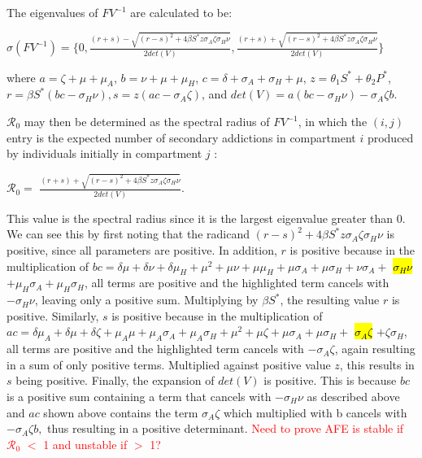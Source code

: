 \documentclass[12pt]{article}
\begin{document}
The eigenvalues of $FV^{-1}$ are calculated to be: 
\begin{center}
$\sigma (FV^{-1}) = \{0, \frac{(r+s)-\sqrt{(r-s)^2+4\beta S^* z  \sigma_A \zeta \sigma_H \nu}}{2det(V)} 
, \frac{(r+s)+\sqrt{(r-s)^2+4\beta S^* z  \sigma_A \zeta \sigma_H \nu}}{2det(V)} 
\}$
\end{center}

where $a=\zeta +\mu + \mu_A$, $b=\nu + \mu + \mu_H$, $c=\delta + \sigma_A + \sigma_H +\mu$, $z=\theta_1 S^* + \theta_2 P^*$, $ r=\beta S^* (bc-\sigma_H \nu), s=z(ac-\sigma_{A} \zeta)$, and $det(V)=a(bc-\sigma_H\nu)-\sigma_A\zeta b$.

$\mathscr{R}_0$ may then be determined as the spectral radius of $FV^{-1}$, in which the $(i,j)$ entry is the expected number of secondary addictions in compartment $i$ produced by individuals initially in compartment $j$ :
\begin{center}
$\mathscr{R}_0=$ $\frac{(r+s)+\sqrt{(r-s)^2+4\beta S^* z  \sigma_A \zeta \sigma_H \nu}}{2det(V)}. $
\end{center}

This value is the spectral radius since it is the largest eigenvalue greater than 0. We can see this by first noting that the radicand $(r-s)^2+4\beta S^* z  \sigma_{A} \zeta \sigma_{H} \nu$ is positive, since all parameters are positive. In addition, $r$ is positive because in the multiplication of $bc=\delta \mu + \delta \nu+ \delta \mu_{H}+ \mu^{2} + \mu \nu+ \mu \mu_{H} + \mu \sigma_{A} + \mu \sigma_{H}+ \nu \sigma_{A}+$ \hl{$ \sigma_{H} \nu $} $+ \mu_{H}\sigma_{A}+\mu_{H}\sigma_{H}$, all terms are positive and the highlighted term cancels with $-\sigma_{H} \nu$, leaving only a positive sum. Multiplying by $\beta S^*$, the resulting value $r$ is positive. Similarly, $s$ is positive because in the multiplication of $ac=\delta \mu_{A} + \delta \mu + \delta \zeta + \mu_{A} \mu+ \mu_{A} \sigma_{A}+\mu_{A} \sigma_{H} +\mu^{2} +\mu \zeta+ \mu \sigma_{A}+\mu \sigma_{H}+$ \hl{$\sigma_{A} \zeta$} $+ \zeta \sigma_{H}$, all terms are positive and the highlighted term cancels with $-\sigma_{A} \zeta$, again resulting in a sum of only positive terms. Multiplied against positive value $z$, this results in $s$ being positive. Finally, the expansion of $det(V)$ is positive. This is because $bc$ is a positive sum containing a term that cancels with $-\sigma_{H} \nu$ as described above and $ac$ shown above contains the term $\sigma_{A} \zeta$ which multiplied with b cancels with $-\sigma_A\zeta b,$ thus resulting in a positive determinant. \textcolor{red}{Need to prove AFE is stable if $\mathscr{R}_0$ $<$ 1 and unstable if $>$ 1?}
\end{document}

